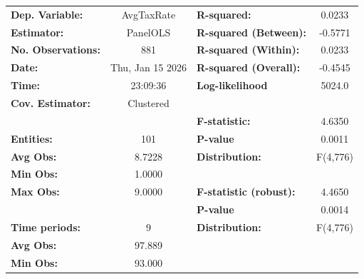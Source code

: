 \begin{center}
\begin{tabular}{lclc}
\toprule
\textbf{Dep. Variable:}                          &     AvgTaxRate     & \textbf{  R-squared:         }   &      0.0233      \\
\textbf{Estimator:}                              &      PanelOLS      & \textbf{  R-squared (Between):}  &     -0.5771      \\
\textbf{No. Observations:}                       &        881         & \textbf{  R-squared (Within):}   &      0.0233      \\
\textbf{Date:}                                   &  Thu, Jan 15 2026  & \textbf{  R-squared (Overall):}  &     -0.4545      \\
\textbf{Time:}                                   &      23:09:36      & \textbf{  Log-likelihood     }   &      5024.0      \\
\textbf{Cov. Estimator:}                         &     Clustered      & \textbf{                     }   &                  \\
\textbf{}                                        &                    & \textbf{  F-statistic:       }   &      4.6350      \\
\textbf{Entities:}                               &        101         & \textbf{  P-value            }   &      0.0011      \\
\textbf{Avg Obs:}                                &       8.7228       & \textbf{  Distribution:      }   &     F(4,776)     \\
\textbf{Min Obs:}                                &       1.0000       & \textbf{                     }   &                  \\
\textbf{Max Obs:}                                &       9.0000       & \textbf{  F-statistic (robust):} &      4.4650      \\
\textbf{}                                        &                    & \textbf{  P-value            }   &      0.0014      \\
\textbf{Time periods:}                           &         9          & \textbf{  Distribution:      }   &     F(4,776)     \\
\textbf{Avg Obs:}                                &       97.889       & \textbf{                     }   &                  \\
\textbf{Min Obs:}                                &       93.000       & \textbf{                     }   &                  \\

\end{tabular}
\end{center}
